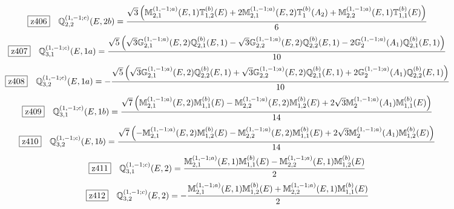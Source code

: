 \documentclass[fleqn,10pt,landscape]{jsarticle}
\begin{document}
\begin{dmath*}
\hspace*{3mm}\fbox{z406}\quad \mathbb{Q}_{2,2}^{(1,-1;c)}(E,2b)=\frac{\sqrt{3} \left(\mathbb{M}_{2,1}^{(1,-1;a)}(E,1) \mathbb{T}_{1,2}^{(b)}(E) + 2 \mathbb{M}_{2,1}^{(1,-1;a)}(E,2) \mathbb{T}_{1}^{(b)}(A_{2}) + \mathbb{M}_{2,2}^{(1,-1;a)}(E,1) \mathbb{T}_{1,1}^{(b)}(E)\right)}{6}
\end{dmath*}
\begin{dmath*}
\hspace*{3mm}\fbox{z407}\quad \mathbb{Q}_{3,1}^{(1,-1;c)}(E,1a)=\frac{\sqrt{5} \left(\sqrt{3} \mathbb{G}_{2,1}^{(1,-1;a)}(E,2) \mathbb{Q}_{2,1}^{(b)}(E,1) - \sqrt{3} \mathbb{G}_{2,2}^{(1,-1;a)}(E,2) \mathbb{Q}_{2,2}^{(b)}(E,1) - 2 \mathbb{G}_{2}^{(1,-1;a)}(A_{1}) \mathbb{Q}_{2,1}^{(b)}(E,1)\right)}{10}
\end{dmath*}
\begin{dmath*}
\hspace*{3mm}\fbox{z408}\quad \mathbb{Q}_{3,2}^{(1,-1;c)}(E,1a)=- \frac{\sqrt{5} \left(\sqrt{3} \mathbb{G}_{2,1}^{(1,-1;a)}(E,2) \mathbb{Q}_{2,2}^{(b)}(E,1) + \sqrt{3} \mathbb{G}_{2,2}^{(1,-1;a)}(E,2) \mathbb{Q}_{2,1}^{(b)}(E,1) + 2 \mathbb{G}_{2}^{(1,-1;a)}(A_{1}) \mathbb{Q}_{2,2}^{(b)}(E,1)\right)}{10}
\end{dmath*}
\begin{dmath*}
\hspace*{3mm}\fbox{z409}\quad \mathbb{Q}_{3,1}^{(1,-1;c)}(E,1b)=\frac{\sqrt{7} \left(\mathbb{M}_{2,1}^{(1,-1;a)}(E,2) \mathbb{M}_{1,1}^{(b)}(E) - \mathbb{M}_{2,2}^{(1,-1;a)}(E,2) \mathbb{M}_{1,2}^{(b)}(E) + 2 \sqrt{3} \mathbb{M}_{2}^{(1,-1;a)}(A_{1}) \mathbb{M}_{1,1}^{(b)}(E)\right)}{14}
\end{dmath*}
\begin{dmath*}
\hspace*{3mm}\fbox{z410}\quad \mathbb{Q}_{3,2}^{(1,-1;c)}(E,1b)=\frac{\sqrt{7} \left(- \mathbb{M}_{2,1}^{(1,-1;a)}(E,2) \mathbb{M}_{1,2}^{(b)}(E) - \mathbb{M}_{2,2}^{(1,-1;a)}(E,2) \mathbb{M}_{1,1}^{(b)}(E) + 2 \sqrt{3} \mathbb{M}_{2}^{(1,-1;a)}(A_{1}) \mathbb{M}_{1,2}^{(b)}(E)\right)}{14}
\end{dmath*}
\begin{dmath*}
\hspace*{3mm}\fbox{z411}\quad \mathbb{Q}_{3,1}^{(1,-1;c)}(E,2)=\frac{\mathbb{M}_{2,1}^{(1,-1;a)}(E,1) \mathbb{M}_{1,1}^{(b)}(E) - \mathbb{M}_{2,2}^{(1,-1;a)}(E,1) \mathbb{M}_{1,2}^{(b)}(E)}{2}
\end{dmath*}
\begin{dmath*}
\hspace*{3mm}\fbox{z412}\quad \mathbb{Q}_{3,2}^{(1,-1;c)}(E,2)=- \frac{\mathbb{M}_{2,1}^{(1,-1;a)}(E,1) \mathbb{M}_{1,2}^{(b)}(E) + \mathbb{M}_{2,2}^{(1,-1;a)}(E,1) \mathbb{M}_{1,1}^{(b)}(E)}{2}
\end{dmath*}
\end{document}

